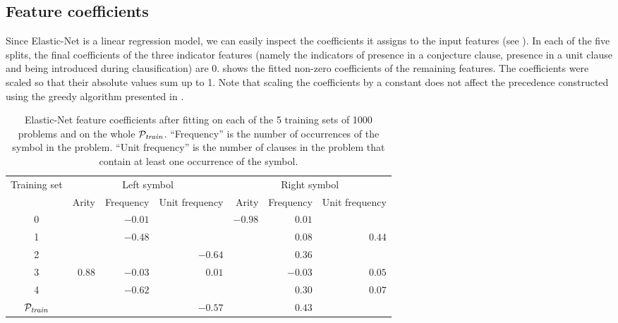\documentclass{ceurart}
\begin{document}

\subsection{Feature coefficients}

Since Elastic-Net is a linear regression model, we can easily inspect the coefficients it assigns
to the input features (see ).
In each of the five splits, the final coefficients of the three indicator features
(namely the indicators of presence in a conjecture clause,
presence in a unit clause and
being introduced during clausification)
are 0.
 shows the fitted non-zero coefficients of the remaining features.
The coefficients were scaled so that their absolute values sum up to 1.
Note that scaling the coefficients by a constant does not affect
the precedence constructed using the greedy algorithm presented in .

\begin{table*}
    \caption{Elastic-Net feature coefficients after fitting on each of the 5 training sets of 1000 problems and on the whole \(\mathcal{P}_{\mathit{train}}\).
		``Frequency'' is the number of occurrences of the symbol in the problem.
		``Unit frequency'' is the number of clauses in the problem that contain at least one occurrence of the symbol.}
	\label{table:feature-weights}
	\begin{tabular}{c|rrr|rrr}
	    \toprule
		Training set & \multicolumn{3}{c}{Left symbol} & \multicolumn{3}{c}{Right symbol} \\
		& Arity & Frequency & Unit frequency & Arity & Frequency & Unit frequency \\
		\midrule
		0 &       &$-0.01$&       &$-0.98$&$ 0.01$&        \\
		1 &       &$-0.48$&       &       &$ 0.08$&$ 0.44 $\\
		2 &       &       &$-0.64$&       &$ 0.36$&        \\
		3 &$ 0.88$&$-0.03$&$ 0.01$&       &$-0.03$&$ 0.05 $\\
		4 &       &$-0.62$&       &       &$ 0.30$&$ 0.07 $\\
		\midrule
		\(\mathcal{P}_{\mathit{train}}\) &       &       &$-0.57$&       &$ 0.43$&        \\
		\bottomrule
	\end{tabular}
\end{table*}
\end{document}
